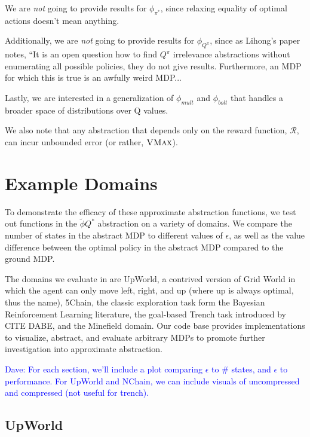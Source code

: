 \documentclass{article}
\newcommand{\ep}{\widetilde \phi}
\newcommand\dnote[1]{\textcolor{blue}{Dave: #1}}
\begin{document}
We are {\it not} going to provide results for $\phi_{\pi^*}$, since relaxing equality of optimal actions doesn't mean anything.

Additionally, we are {\it not} going to provide results for $\phi_{Q^\pi}$, since as Lihong's paper notes, ``It is an open question how to find $Q^\pi$ irrelevance abstractions without enumerating all possible policies, they do not give results. Furthermore, an MDP for which this is true is an awfully weird MDP...

Lastly, we are interested in a generalization of $\phi_{mult}$  and $\phi_{bolt}$ that handles a broader space of distributions over Q values.

We also note that any abstraction that depends only on the reward function, $\mathcal{R}$, can incur unbounded error (or rather, $\textsc{VMax}$).




\section{Example Domains}

To demonstrate the efficacy of these approximate abstraction functions, we test out functions in the $\ep{Q^*}$ abstraction on a variety of domains. We compare the number of states in the abstract MDP to different values of $\epsilon$, as well as the value difference between the optimal policy in the abstract MDP compared to the ground MDP.

The domains we evaluate in are UpWorld, a contrived version of Grid World in which the agent can only move left, right, and up (where up is always optimal, thus the name), 5Chain, the classic exploration task form the Bayesian Reinforcement Learning literature, the goal-based Trench task introduced by CITE DABE, and the Minefield domain. Our code base provides implementations to visualize, abstract, and evaluate arbitrary MDPs to promote further investigation into approximate abstraction.


\dnote{For each section, we'll include a plot comparing $\epsilon$ to \# states, and $\epsilon$ to performance. For UpWorld and NChain, we can include visuals of uncompressed and compressed (not useful for trench).}

\subsection{UpWorld}
\end{document}

